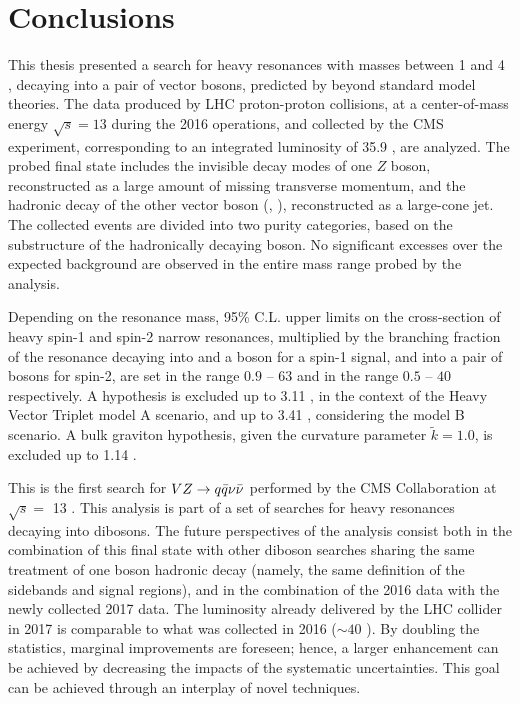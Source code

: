 \chapter{Conclusions}
\label{ch:conclusion}

This thesis presented a search for heavy resonances with masses between 1 \TeV and 4 \TeV, decaying into a pair of vector bosons, predicted by beyond standard model theories. The data produced by LHC proton-proton collisions, at a center-of-mass energy $\sqrt{s}=13$ \TeV during the 2016 operations, and collected by the CMS experiment, corresponding to an integrated luminosity of 35.9 \fbinv, are analyzed. The probed final state includes the invisible decay modes of one $Z$ boson, reconstructed as a large amount of missing transverse momentum, and the hadronic decay of the other vector boson (\Z, \W), reconstructed as a large-cone jet. The collected events are divided into two purity categories, based on the substructure of the hadronically decaying \V boson. No significant excesses over the expected background are observed in the entire mass range probed by the analysis.

\noindent Depending on the resonance mass, 95\% C.L. upper limits on the cross-section of heavy spin-1 and spin-2 narrow resonances, multiplied by the branching fraction of the resonance decaying into \Z and a \W boson for a spin-1 signal, and into a pair of \Z bosons for spin-2, are set in the range $0.9$ -- $63$ \fb and in the range $0.5$ -- $40$ \fb respectively. A \Wp hypothesis is excluded up to 3.11 \TeV, in the context of the Heavy Vector Triplet model A scenario, and up to 3.41 \TeV, considering the model B scenario. A bulk graviton hypothesis, given the curvature parameter $\tilde{k}=1.0$, is excluded up to 1.14 \TeV.

\vspace*{1\baselineskip}

\noindent This is the first search for $VZ \rightarrow q \bar{q} \nu \bar{\nu}$ performed by the CMS Collaboration at $\sqrt{s} = $ 13 \TeV. This analysis is part of a set of searches for heavy resonances decaying into dibosons. The future perspectives of the analysis consist both in the combination of this final state with other diboson searches sharing the same treatment of one boson hadronic decay (namely, the same definition of the sidebands and signal regions), and in the combination of the 2016 data with the newly collected 2017 data. The luminosity already delivered by the LHC collider in 2017 is comparable to what was collected in 2016 ($\sim 40$ \fbinv). By doubling the statistics, marginal improvements are foreseen; hence, a larger enhancement can be achieved by decreasing the impacts of the systematic uncertainties. This goal can be achieved through an interplay of novel techniques.

